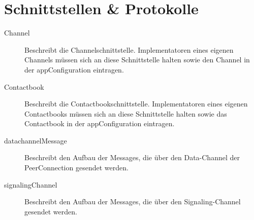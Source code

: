 \chapter{Schnittstellen \& Protokolle}
	\begin{description}
		\item[Channel] Beschreibt die Channelschnittstelle. Implementatoren eines eigenen Channels müssen sich an diese Schnittstelle halten sowie den Channel in der appConfiguration eintragen.
		\item[Contactbook] Beschreibt die Contactbookschnittstelle. Implementatoren eines eigenen Contactbooks müssen sich an diese Schnittstelle halten sowie das Contactbook in der appConfiguration eintragen.
		\item[datachannelMessage] Beschreibt den Aufbau der Messages, die über den Data-Channel der PeerConnection gesendet werden.
		\item[signalingChannel] Beschreibt den Aufbau der Messages, die über den Signaling-Channel gesendet werden.
	\end{description}

	
	
	
	